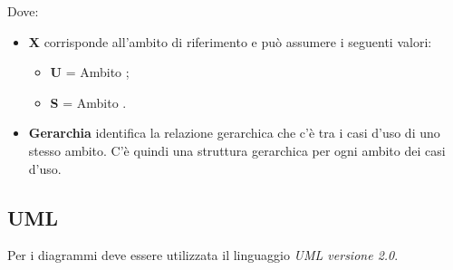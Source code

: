 Dove: %
\begin{itemize}
 \item \textbf{X} corrisponde all'ambito di riferimento e può assumere i seguenti valori:
	\begin{itemize}
	 \item[] \textbf{U} = Ambito ;
	 \item[] \textbf{S} = Ambito .
	\end{itemize}

	 \item \textbf{Gerarchia} identifica la relazione gerarchica che c'è tra i casi d'uso di uno stesso ambito. C'è quindi una struttura gerarchica per ogni ambito dei casi d'uso.
\end{itemize}


\subsection{UML}

Per i diagrammi deve essere utilizzata il linguaggio \emph{UML versione 2.0}.